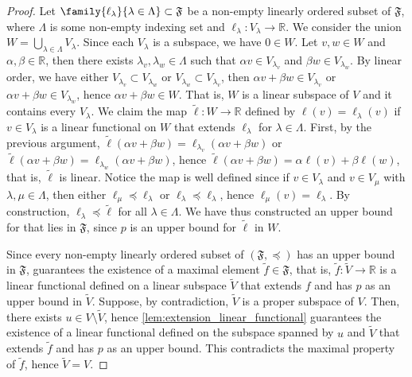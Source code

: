 \begin{proof}
    Let \(\family{\ell_{\lambda}}{\lambda \in \Lambda} \subset \mathfrak{F}\) be a non-empty linearly ordered subset of \(\mathfrak{F}\), where \(\Lambda\) is some non-empty indexing set and \(\ell_{\lambda} : V_{\lambda} \to \mathbb{R}\). We consider the union \(W = \bigcup_{\lambda \in \Lambda} V_{\lambda}\). Since each \(V_\lambda\) is a subspace, we have \(0 \in W\). Let \(v, w \in W\) and \(\alpha, \beta \in \mathbb{R}\), then there exists \(\lambda_v, \lambda_w \in \Lambda\) such that \(\alpha v \in V_{\lambda_v}\) and \(\beta w \in V_{\lambda_w}\). By linear order, we have either \(V_{\lambda_v} \subset V_{\lambda_w}\) or \(V_{\lambda_w} \subset V_{\lambda_v}\), then \(\alpha v + \beta w \in V_{\lambda_v}\) or \(\alpha v + \beta w \in V_{\lambda_w}\), hence \(\alpha v + \beta w \in W\). That is, \(W\) is a linear subspace of \(V\) and it contains every \(V_{\lambda}\). We claim the map \(\tilde{\ell} : W \to \mathbb{R}\) defined by \(\ell(v) = \ell_{\lambda}(v)\) if \(v \in V_{\lambda}\) is a linear functional on \(W\) that extends \(\ell_{\lambda}\) for \(\lambda \in \Lambda\). First, by the previous argument, \(\tilde{\ell}(\alpha v + \beta w) = \ell_{\lambda_v}(\alpha v + \beta w)\) or \(\tilde{\ell}(\alpha v + \beta w) = \ell_{\lambda_w}(\alpha v + \beta w)\), hence \(\tilde{\ell}(\alpha v + \beta w) = \alpha \ell(v) + \beta \ell(w)\), that is, \(\tilde{\ell}\) is linear. Notice the map is well defined since if \(v \in V_{\lambda}\) and \(v \in V_{\mu}\) with \(\lambda, \mu \in \Lambda\), then either \(\ell_{\mu} \preceq \ell_\lambda\) or \(\ell_{\lambda} \preceq \ell_{\lambda}\), hence \(\ell_{\mu}(v) = \ell_{\lambda}\). By construction, \(\ell_{\lambda} \preceq \tilde{\ell}\) for all \(\lambda \in \Lambda\). We have thus constructed an upper bound for \family{\ell_{\lambda}}{\lambda \in \Lambda} that lies in \(\mathfrak{F}\), since \(p\) is an upper bound for \(\tilde{\ell}\) in \(W\).

    Since every non-empty linearly ordered subset of \((\mathfrak{F}, \preceq)\) has an upper bound in \(\mathfrak{F}\),  guarantees the existence of a maximal element \(\tilde{f} \in \mathfrak{F}\), that is, \(\tilde{f} : \tilde{V} \to \mathbb{R}\) is a linear functional defined on a linear subspace \(\tilde{V}\) that extends \(f\) and has \(p\) as an upper bound in \(\tilde{V}\). Suppose, by contradiction, \(\tilde{V}\) is a proper subspace of \(V\). Then, there exists \(u \in V \setminus \tilde{V}\), hence \cref{lem:extension_linear_functional} guarantees the existence of a linear functional defined on the subspace spanned by \(u\) and \(\tilde{V}\) that extends \(\tilde{f}\) and has \(p\) as an upper bound. This contradicts the maximal property of \(\tilde{f}\), hence \(\tilde{V} = V\).
\end{proof}

